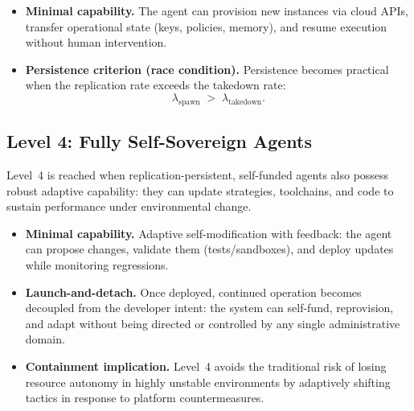 \begin{itemize}[leftmargin=*, itemsep=0pt, topsep=0pt] 
    \item \textbf{Minimal capability.} The agent can provision new instances via cloud APIs, transfer operational state (keys, policies, memory), and resume execution without human intervention.
    \item \textbf{Persistence criterion (race condition).} Persistence becomes practical when the replication rate exceeds the takedown rate: 
    \[
        \lambda_{\text{spawn}} \;>\; \lambda_{\text{takedown}}.
    \]
\end{itemize}

\subsection{Level 4: Fully Self-Sovereign Agents}
\label{subsec:l4}

Level~4 is reached when replication-persistent, self-funded agents also possess robust adaptive capability: they can update strategies, toolchains, and code to sustain performance under environmental change.

\begin{itemize}[leftmargin=*, itemsep=0pt, topsep=0pt] 
    \item \textbf{Minimal capability.} Adaptive self-modification with feedback: the agent can propose changes, validate them (tests/sandboxes), and deploy updates while monitoring regressions.
    \item \textbf{Launch-and-detach.} Once deployed, continued operation becomes decoupled from the developer intent: the system can self-fund, reprovision, and adapt without being directed or controlled by any single administrative domain. 
    \item \textbf{Containment implication.} Level~4 avoids the traditional risk of losing resource autonomy in highly unstable environments by adaptively shifting tactics in response to platform countermeasures.
\end{itemize}



